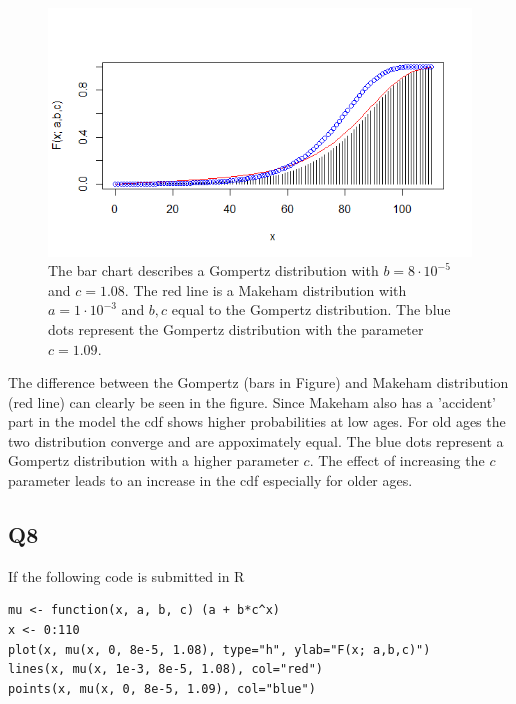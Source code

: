\begin{center}
\begin{figure}[H]

\includegraphics[scale=1]{Question_7_MakehamGompertz.png}

\caption{The bar chart describes a Gompertz distribution with $b = 8 \cdot 10^{-5}$ and $c=1.08$. The red line is a Makeham distribution with $a=1\cdot 10^{-3}$ and $b, c$ equal to the Gompertz distribution. The blue dots represent the Gompertz distribution with the parameter $c = 1.09$.}
\label{Figure_Question7}

\end{figure}
\end{center}

The difference between the Gompertz (bars in Figure) and Makeham distribution (red line) can clearly be seen in the figure. Since Makeham also has a 'accident' part in the model the cdf shows higher probabilities at low ages. For old ages the two distribution converge and are appoximately equal. The blue dots represent a Gompertz distribution with a higher parameter $c$. The effect of increasing the $c$ parameter leads to an increase in the cdf especially for older ages.


\subsection*{Q8}

If the following code is submitted in R

\begin{verbatim}
mu <- function(x, a, b, c) (a + b*c^x)
x <- 0:110
plot(x, mu(x, 0, 8e-5, 1.08), type="h", ylab="F(x; a,b,c)")
lines(x, mu(x, 1e-3, 8e-5, 1.08), col="red")
points(x, mu(x, 0, 8e-5, 1.09), col="blue")
\end{verbatim}

